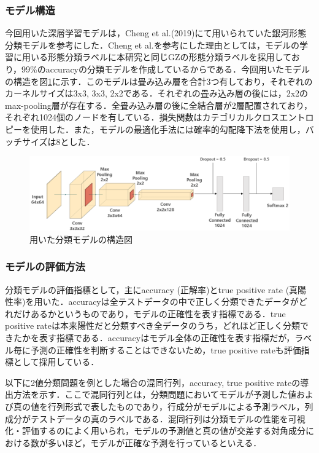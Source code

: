 \documentclass[a4j, 11pt]{jreport}
\begin{document}
\subsubsection{モデル構造}
今回用いた深層学習モデルは，Cheng et al.(2019)\cite{Cheng2019}にて用いられていた銀河形態分類モデルを参考にした．Cheng et al.を参考にした理由としては，モデルの学習に用いる形態分類ラベルに本研究と同じGZの形態分類ラベルを採用しており，99\%のaccuracyの分類モデルを作成しているからである．今回用いたモデルの構造を図\ref{fig:model_shape}に示す．このモデルは畳み込み層を合計3つ有しており，それぞれのカーネルサイズは3x3, 3x3, 2x2である．それぞれの畳み込み層の後には，2x2のmax-pooling層が存在する．全畳み込み層の後に全結合層が2層配置されており，それぞれ1024個のノードを有している．損失関数はカテゴリカルクロスエントロピーを使用した．また，モデルの最適化手法には確率的勾配降下法を使用し，バッチサイズは8とした．

\begin{figure}[h]
	\centering
	\includegraphics[width=14cm]{images/model_shape.png}
	\caption{用いた分類モデルの構造図}
	\label{fig:model_shape}
\end{figure}
 
\subsubsection{モデルの評価方法}
分類モデルの評価指標として，主にaccuracy (正解率)とtrue positive rate (真陽性率)を用いた．accuracyは全テストデータの中で正しく分類できたデータがどれだけあるかというものであり，モデルの正確性を表す指標である．true positive rateは本来陽性だと分類すべき全データのうち，どれほど正しく分類できたかを表す指標である．accuracyはモデル全体の正確性を表す指標だが，ラベル毎に予測の正確性を判断することはできないため，true positive rateも評価指標として採用している．

以下に2値分類問題を例とした場合の混同行列，accuracy, true positive rateの導出方法を示す．ここで混同行列とは，分類問題においてモデルが予測した値および真の値を行列形式で表したものであり，行成分がモデルによる予測ラベル，列成分がテストデータの真のラベルである．混同行列は分類モデルの性能を可視化・評価するのによく用いられ，モデルの予測値と真の値が交差する対角成分における数が多いほど，モデルが正確な予測を行っているといえる．
\end{document}

